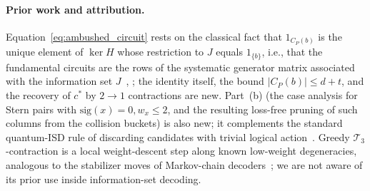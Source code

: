 \documentclass[12pt]{article}
\theoremstyle{definition}
\newcommand{\Tc}{\mathcal{T}_3}
\begin{document}
\paragraph{Prior work and attribution.}
Equation~\eqref{eq:ambushed_circuit} rests on the classical fact that $1_{C_P(b)}$ is the unique element of $\ker
H$ whose restriction to $J$ equals $1_{\{b\}}$, i.e., that the fundamental circuits are the rows of the systematic
generator matrix associated with the information set $J$~\cite{Prange1962,MacWilliamsSloane1977},
\cite[Cor.~1.2.6]{Oxley2011}; the identity itself, the bound $|C_P(b)| \le d + t$, and the recovery of $c^*$ by $2
\to 1$ contractions are new. Part~(b) (the case analysis for Stern pairs with $\mathrm{sig}(x) = 0, w_x \le 2$, and
the resulting loss-free pruning of such columns from the collision buckets) is also new; it complements the
standard quantum-ISD rule of discarding candidates with trivial logical
action~\cite{PryadkoShabashovKozin2022QDistRnd}. Greedy $\Tc$-contraction is a local weight-descent step along
known low-weight degeneracies, analogous to the stabilizer moves of Markov-chain
decoders~\cite{WoottonLoss2012,HutterWoottonLoss2014}; we are not aware of its prior use inside information-set
decoding.
\end{document}
